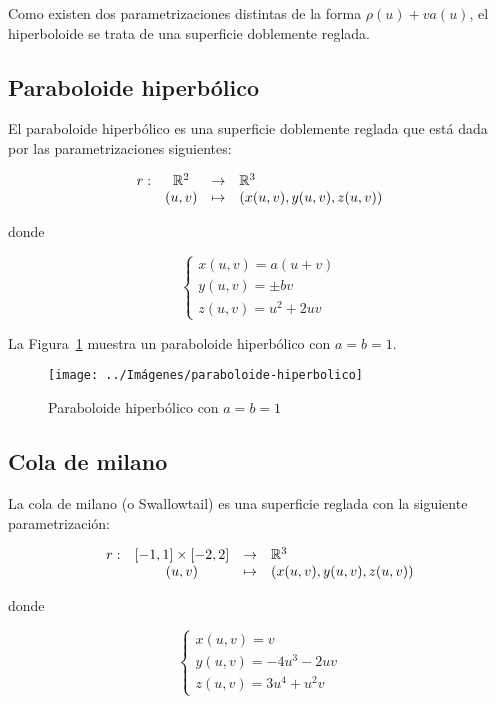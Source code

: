 \documentclass[10pt,a4paper]{article}
\begin{document}
Como existen dos parametrizaciones distintas de la forma $\rho(u) + v a(u)$, el hiperboloide se trata de una superficie doblemente reglada.

\subsection{Paraboloide hiperbólico}

\begin{defi}
	
El paraboloide hiperbólico es una superficie doblemente reglada que está dada por las parametrizaciones siguientes:

$$\begin{array}{rcll}
r : & \mathbb{R}^2 & \to & \mathbb{R}^3\\
& (u,v) & \mapsto & (x(u,v),y(u,v),z(u,v))
\end{array}$$

donde 

$$ \begin{cases}
x(u,v) = a(u+v) \\
y(u,v) = \pm bv \\
z(u,v) = u^2 +2uv
\end{cases} $$
\end{defi}

La Figura~\ref{fig:Paraboloide hiperbólico-2} muestra un paraboloide hiperbólico con $a = b = 1$.

\begin{figure}[htbp]
	\centering
	\texttt{[image: ../Imágenes/paraboloide-hiperbolico]}
	\caption{Paraboloide hiperbólico con $a = b = 1$}
	\label{fig:Paraboloide hiperbólico-2}
\end{figure}

\subsection{Cola de milano}

\begin{defi}
La cola de milano (o Swallowtail) es una superficie reglada con la siguiente parametrización:

$$\begin{array}{rcll}
	r : & [-1, 1] \times [-2,2] & \to & \mathbb{R}^3\\
	& (u,v) & \mapsto & (x(u,v),y(u,v),z(u,v))
	\end{array}$$
	
	donde 
	
	$$ \begin{cases}
	x(u,v) = v \\
	y(u,v) = -4u^3 - 2uv \\
	z(u,v) = 3u^4 + u^2v
	\end{cases} $$
\end{defi}
\end{document}

